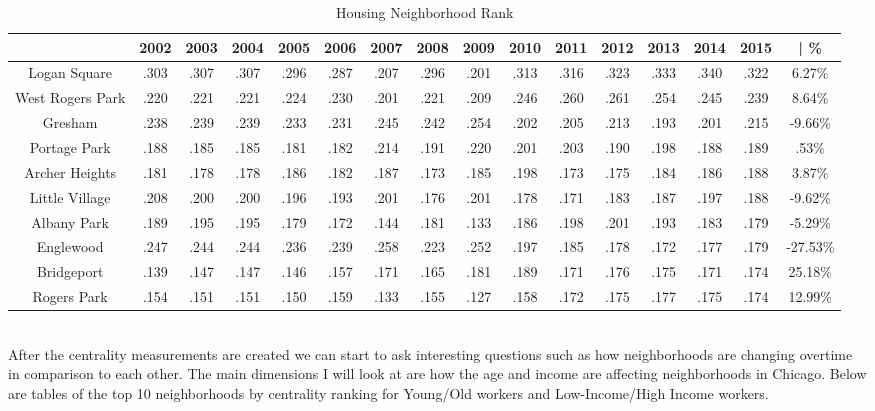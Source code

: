 \documentclass{article}
\theoremstyle{definition}
\theoremstyle{remark}
\begin{document}
\begin{table}[h]\centering
\caption{Housing Neighborhood Rank}\label{thelabel}

\begin{adjustbox}{center}
\begin{tabular}{||c | c c c c c c c c c c c c c c | c ||} 
 \hline
 & 2002 & 2003 & 2004 & 2005 & 2006 & 2007 & 2008 & 2009 & 2010 & 2011 & 2012 & 2013 & 2014 & 2015 & | \%\\[0.5ex] 
 \hline\hline
Logan Square & .303 & .307 & .307 & .296 & .287 & .207 & .296 & .201 & .313 & .316 & .323 & .333 & .340 & .322 & 6.27\% \\
West Rogers Park & .220 & .221 & .221 & .224 & .230 & .201 & .221 & .209 & .246 & .260 & .261 & .254 & .245 & .239 & 8.64\% \\
Gresham & .238 & .239 & .239 & .233 & .231 & .245 & .242 & .254 & .202 & .205 & .213 & .193 & .201 & .215 & -9.66\% \\
Portage Park & .188 & .185 & .185 & .181 & .182 & .214 & .191 & .220 & .201 & .203 & .190 & .198 & .188 & .189 & .53\% \\
Archer Heights & .181 & .178 & .178 & .186 & .182 & .187 & .173 & .185 & .198 & .173 & .175 & .184 & .186 & .188 & 3.87\% \\
Little Village & .208 & .200 & .200 & .196 & .193 & .201 & .176 & .201 & .178 & .171 & .183 & .187 & .197 & .188 & -9.62\% \\
Albany Park & .189 & .195 & .195 & .179 & .172 & .144 & .181 & .133 & .186 & .198 & .201 & .193 & .183 & .179 & -5.29\% \\
Englewood & .247 & .244 & .244 & .236 & .239 & .258 & .223 & .252 & .197 & .185 & .178 & .172 & .177 & .179 & -27.53\% \\
Bridgeport & .139 & .147 & .147 & .146 & .157 & .171 & .165 & .181 & .189 & .171 & .176 & .175 & .171 & .174 & 25.18\% \\
Rogers Park & .154 & .151 & .151 & .150 & .159 & .133 & .155 & .127 & .158 & .172 & .175 & .177 & .175 & .174 & 12.99\% \\ \hline
 \end{tabular}
\end{adjustbox}
\end{table}








\\

After the centrality measurements are created we can start to ask interesting questions such as how neighborhoods are changing overtime in comparison to each other.  The main dimensions I will look at are how the age and income are affecting neighborhoods in Chicago.  Below are tables of the top 10 neighborhoods by centrality ranking for Young/Old workers and Low-Income/High Income workers.\\
\end{document}
